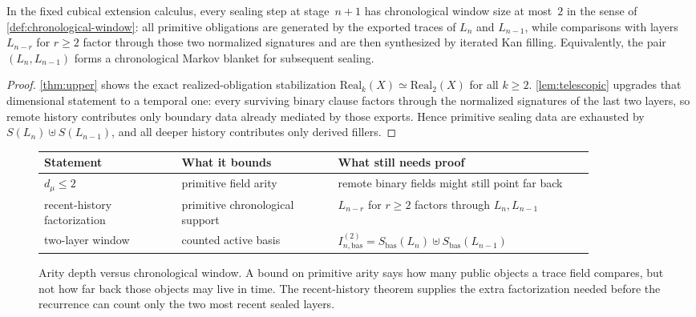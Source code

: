 \documentclass{lmcs}
\newcommand{\Real}{\mathrm{Real}}
\begin{document}
\begin{cor}
\label{cor:chrono-window}
In the fixed cubical extension calculus, every sealing step at stage~$n+1$ has chronological window size at most~$2$ in the sense of \autoref{def:chronological-window}: all primitive obligations are generated by the exported traces of $L_n$ and $L_{n-1}$, while comparisons with layers $L_{n-r}$ for $r \geq 2$ factor through those two normalized signatures and are then synthesized by iterated Kan filling. Equivalently, the pair $(L_n,L_{n-1})$ forms a chronological Markov blanket for subsequent sealing.
\end{cor}

\begin{proof}
\autoref{thm:upper} shows the exact realized-obligation stabilization $\Real_k(X) \simeq \Real_2(X)$ for all $k \geq 2$. \autoref{lem:telescopic} upgrades that dimensional statement to a temporal one: every surviving binary clause factors through the normalized signatures of the last two layers, so remote history contributes only boundary data already mediated by those exports. Hence primitive sealing data are exhausted by $S(L_n)\uplus S(L_{n-1})$, and all deeper history contributes only derived fillers.
\end{proof}

\begin{figure}[t]
\centering
\small
\begin{tabular}{@{}p{0.22\linewidth}p{0.25\linewidth}p{0.41\linewidth}@{}}
\toprule
Statement & What it bounds & What still needs proof \\
\midrule
$d_\mu\leq2$ & primitive field arity &
remote binary fields might still point far back \\
recent-history factorization &
primitive chronological support &
$L_{n-r}$ for $r\geq2$ factors through $L_n,L_{n-1}$ \\
two-layer window &
counted active basis &
$I_{n,\mathrm{bas}}^{(2)}=S_{\mathrm{bas}}(L_n)\uplus S_{\mathrm{bas}}(L_{n-1})$ \\
\bottomrule
\end{tabular}
\caption{Arity depth versus chronological window. A bound on primitive arity says how many public objects a trace field compares, but not how far back those objects may live in time. The recent-history theorem supplies the extra factorization needed before the recurrence can count only the two most recent sealed layers.}
\label{fig:arity-vs-chronology}
\end{figure}
\end{document}
